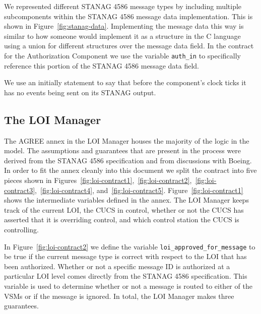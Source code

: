 \documentclass{llncs}
\begin{document}
We represented different STANAG 4586 message types by including multiple subcomponents within the STANAG 4586 message data implementation. This is shown in Figure~\ref{fig:stanag-data}.  Implementing the message data this way is similar to how someone would implement it as a structure in the C language using a union for different structures over the message data field.  In the contract for the Authorization Component we use the variable \texttt{auth\_in} to specifically reference this portion of the STANAG 4586 message data field.

We use an initially statement to say that before the component's clock ticks it has no events being sent on its STANAG output.





\subsection{The LOI Manager}

The AGREE annex in the LOI Manager houses the majority of the logic in the model.  The assumptions and guarantees that are present in the process were derived from the STANAG 4586 specification and from discussions with Boeing. In order to fit the annex cleanly into this document we split the contract into five pieces shown in Figures~\ref{fig:loi-contract1},~\ref{fig:loi-contract2},~\ref{fig:loi-contract3},~\ref{fig:loi-contract4}, and~\ref{fig:loi-contract5}. Figure~\ref{fig:loi-contract1} shows the intermediate variables defined in the annex.  The LOI Manager keeps track of the current LOI, the CUCS in control, whether or not the CUCS has asserted that it is overriding control, and which control station the CUCS is controlling.

In Figure~\ref{fig:loi-contract2} we define the variable \texttt{loi\_approved\_for\_message} to be true if the current message type is correct with respect to the LOI that has been authorized. Whether or not a specific message ID is authorized at a particular LOI level comes directly from the STANAG 4586 specification. This variable is used to determine whether or not a message is routed to either of the VSMs or if the message is ignored.  In total, the LOI Manager makes three guarantees.
\end{document}
